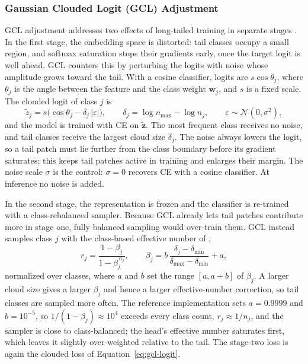 \documentclass[11pt]{article}
\begin{document}
\subsubsection{Gaussian Clouded Logit (GCL) Adjustment}
GCL adjustment addresses two effects of long-tailed training in separate stages \citep{li2022gaussianClouded}. In the first stage, the embedding space is distorted: tail classes occupy a small region, and softmax saturation stops their gradients early, once the target logit is well ahead. GCL counters this by perturbing the logits with noise whose amplitude grows toward the tail. With a cosine classifier, logits are $s\cos\theta_j$, where $\theta_j$ is the angle between the feature and the class weight $\mathbf w_j$, and $s$ is a fixed scale. The clouded logit of class $j$ is
\begin{equation}
  \tilde z_j=s\bigl(\cos\theta_j-\delta_j\,\lvert\varepsilon\rvert\bigr),
  \qquad
  \delta_j=\log n_{\max}-\log n_j,
  \qquad
  \varepsilon\sim\mathcal N(0,\sigma^{2}),
  \label{eq:gcl-logit}
\end{equation}
\noindent and the model is trained with CE on $\tilde{\mathbf z}$. The most frequent class receives no noise, and tail classes receive the largest cloud size $\delta_j$. The noise always lowers the logit, so a tail patch must lie further from the class boundary before its gradient saturates; this keeps tail patches active in training and enlarges their margin. The noise scale $\sigma$ is the control: $\sigma=0$ recovers CE with a cosine classifier. At inference no noise is added.

In the second stage, the representation is frozen and the classifier is re-trained with a class-rebalanced sampler. Because GCL already lets tail patches contribute more in stage one, fully balanced sampling would over-train them. GCL instead samples class $j$ with the class-based effective number of \citet{cui2019classBalanced},
\begin{equation}
  r_j=\frac{1-\beta_j}{1-\beta_j^{\,n_j}},
  \qquad
  \beta_j=b\,\frac{\delta_j-\delta_{\min}}{\delta_{\max}-\delta_{\min}}+a,
  \label{eq:gcl-cben}
\end{equation}
\noindent normalized over classes, where $a$ and $b$ set the range $[a,a+b]$ of $\beta_j$. A larger cloud size gives a larger $\beta_j$ and hence a larger effective-number correction, so tail classes are sampled more often. The reference implementation sets $a=0.9999$ and $b=10^{-5}$, so $1/(1-\beta_j)\approx 10^{4}$ exceeds every class count, $r_j\approx 1/n_j$, and the sampler is close to class-balanced; the head's effective number saturates first, which leaves it slightly over-weighted relative to the tail. The stage-two loss is again the clouded loss of Equation~\eqref{eq:gcl-logit}.
\end{document}
